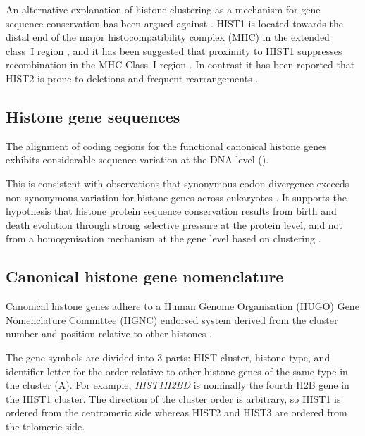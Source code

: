	An alternative explanation of histone clustering as a mechanism for 
	gene sequence conservation has been argued against \citep{NeiRooney2005}.
	HIST1 is located towards the distal end of the major histocompatibility complex (MHC) 
	in the extended class~I region \citep{MHC-I-transcript, MHC-complete-sequencing-1999}, 
	and it has been suggested that proximity to HIST1 
	suppresses recombination in the MHC Class~I region \citep{MHC-repressed-by-HIST}. 
	In contrast it has been reported that HIST2 is prone to 
	deletions and frequent rearrangements \citep{HISTTwo-prone-deletion-discovery, HISTTwo-prone-deletion-focus}. 

\subsection{Histone gene sequences}
	The alignment of coding regions for the functional canonical histone genes 
	exhibits considerable sequence variation at the DNA level ().


	This is consistent with observations that 
	synonymous codon divergence exceeds non-synonymous variation 
	for histone genes across eukaryotes \citep{Piontkivska2002, Rooney2002}. 
	It supports the hypothesis that histone protein sequence conservation 
	results from birth and death evolution through strong selective pressure at the protein level, 
	and not from a homogenisation mechanism at the gene level based on clustering \citep{NeiRooney2005}.

\subsection{Canonical histone gene nomenclature}
	Canonical histone genes adhere to a Human Genome Organisation (HUGO) Gene Nomenclature Committee (HGNC) 
	endorsed system derived from the cluster number and position relative to other histones \citep{Marzluff02}.

	The gene symbols are divided into 3 parts: 
	HIST cluster, histone type, and identifier letter
	for the order relative to other histone genes of the same type in the cluster (A).
	For example, \textit{HIST1H2BD} is nominally the fourth H2B gene in the HIST1 cluster.
	The direction of the cluster order is arbitrary, 
	so HIST1 is ordered from the centromeric side 
	whereas HIST2 and HIST3 are ordered from the telomeric side.

